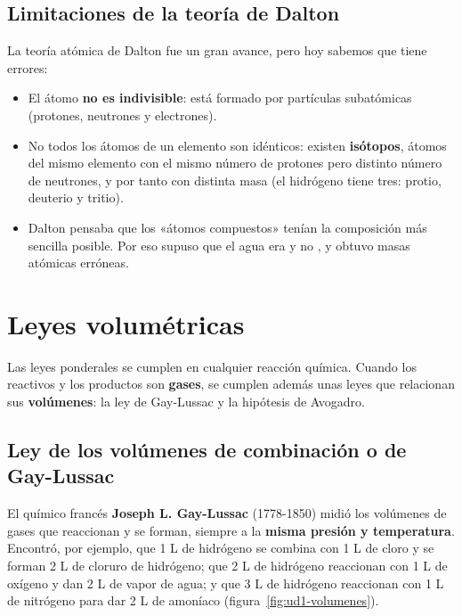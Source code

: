 \subsection{Limitaciones de la teoría de Dalton}

La teoría atómica de Dalton fue un gran avance, pero hoy sabemos que tiene errores:
\begin{itemize}
    \item El átomo \textbf{no es indivisible}: está formado por partículas subatómicas (protones, neutrones y electrones).
    \item No todos los átomos de un elemento son idénticos: existen \textbf{isótopos}, átomos del mismo elemento con el mismo
    número de protones pero distinto número de neutrones, y por tanto con distinta masa (el hidrógeno tiene tres: protio,
    deuterio y tritio).
    \item Dalton pensaba que los «átomos compuestos» tenían la composición más sencilla posible. Por eso supuso que el agua
    era  y no , y obtuvo masas atómicas erróneas.
\end{itemize}

\section{Leyes volumétricas}\label{sec:ud1-volumetricas}

Las leyes ponderales se cumplen en cualquier reacción química. Cuando los reactivos y los productos son \textbf{gases}, se
cumplen además unas leyes que relacionan sus \textbf{volúmenes}: la ley de Gay-Lussac y la hipótesis de Avogadro.

\subsection{Ley de los volúmenes de combinación o de Gay-Lussac}

El químico francés \textbf{Joseph L. Gay-Lussac} (1778-1850) midió los volúmenes de gases que reaccionan y se forman,
siempre a la \textbf{misma presión y temperatura}. Encontró, por ejemplo, que 1 L de hidrógeno se combina con 1 L de cloro y
se forman 2 L de cloruro de hidrógeno; que 2 L de hidrógeno reaccionan con 1 L de oxígeno y dan 2 L de vapor de agua; y que
3 L de hidrógeno reaccionan con 1 L de nitrógeno para dar 2 L de amoníaco (figura~\ref{fig:ud1-volumenes}).

